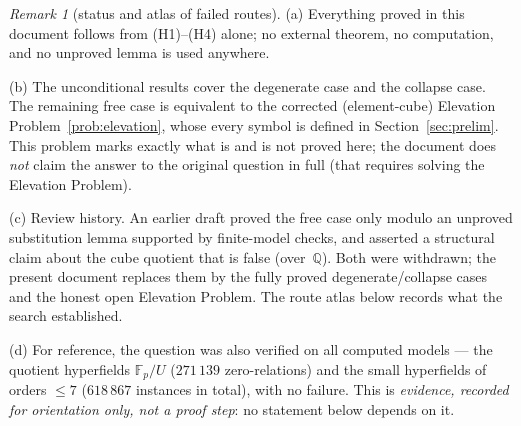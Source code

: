 \documentclass[11pt]{article}
\theoremstyle{definition}
\theoremstyle{remark}
\newtheorem{remark}[theorem]{Remark}
\begin{document}
\begin{remark}[status and atlas of failed routes]\label{rem:honest}
(a) Everything proved in this document follows from (H1)--(H4) alone; no
external theorem, no computation, and no unproved lemma is used anywhere.

(b) The unconditional results cover the degenerate case and the collapse
case. The remaining free case is equivalent to the corrected (element-cube)
Elevation Problem~\ref{prob:elevation}, whose every symbol is defined in
Section~\ref{sec:prelim}. This problem marks exactly what is and is not
proved here; the document does \emph{not} claim the answer to the
original question in full (that requires solving the Elevation Problem).

(c) Review history. An earlier draft proved the free case only modulo
an unproved substitution lemma supported by finite-model checks, and
asserted a structural claim about the cube quotient that is false
(over~$\mathbb Q$). Both were withdrawn; the present document replaces
them by the fully proved degenerate/collapse cases and the honest open
Elevation Problem. The route atlas below records what the search
established.

(d) For reference, the question was also verified on all computed
models --- the quotient hyperfields $\mathbb F_{p}/U$
($271\,139$ zero-relations) and the small hyperfields of orders
$\le7$ ($618\,867$ instances in total), with no failure. This is
\emph{evidence, recorded for orientation only, not a proof step}: no
statement below depends on it.


\end{remark}
\end{document}
